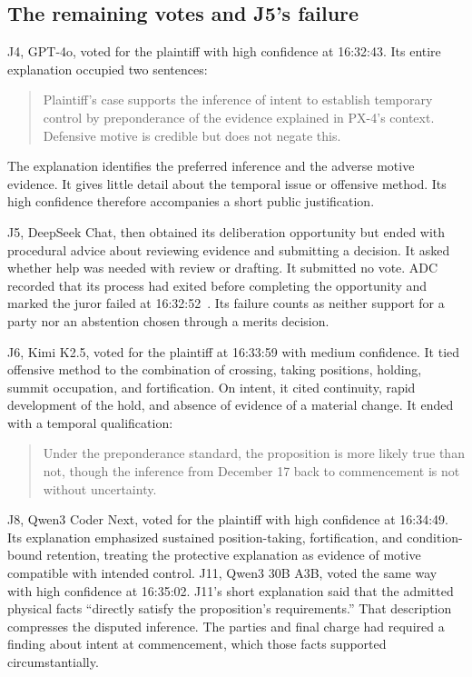 \subsection{The remaining votes and J5's failure}

J4, GPT-4o, voted for the plaintiff with high confidence at 16:32:43.  Its entire explanation occupied two sentences:
\begin{quote}
Plaintiff's case supports the inference of intent to establish temporary control by preponderance of the evidence explained in PX-4's context.  Defensive motive is credible but does not negate this.
\end{quote}
The explanation identifies the preferred inference and the adverse motive evidence.  It gives little detail about the temporal issue or offensive method.  Its high confidence therefore accompanies a short public justification.

J5, DeepSeek Chat, then obtained its deliberation opportunity but ended with procedural advice about reviewing evidence and submitting a decision.  It asked whether help was needed with review or drafting.  It submitted no vote.  ADC recorded that its process had exited before completing the opportunity and marked the juror failed at 16:32:52~\cite[events 349--350 and J5 deliberation log]{record}.  Its failure counts as neither support for a party nor an abstention chosen through a merits decision.

J6, Kimi K2.5, voted for the plaintiff at 16:33:59 with medium confidence.  It tied offensive method to the combination of crossing, taking positions, holding, summit occupation, and fortification.  On intent, it cited continuity, rapid development of the hold, and absence of evidence of a material change.  It ended with a temporal qualification:
\begin{quote}
Under the preponderance standard, the proposition is more likely true than not, though the inference from December 17 back to commencement is not without uncertainty.
\end{quote}

J8, Qwen3 Coder Next, voted for the plaintiff with high confidence at 16:34:49.  Its explanation emphasized sustained position-taking, fortification, and condition-bound retention, treating the protective explanation as evidence of motive compatible with intended control.  J11, Qwen3 30B A3B, voted the same way with high confidence at 16:35:02.  J11's short explanation said that the admitted physical facts “directly satisfy the proposition's requirements.”  That description compresses the disputed inference.  The parties and final charge had required a finding about intent at commencement, which those facts supported circumstantially.

